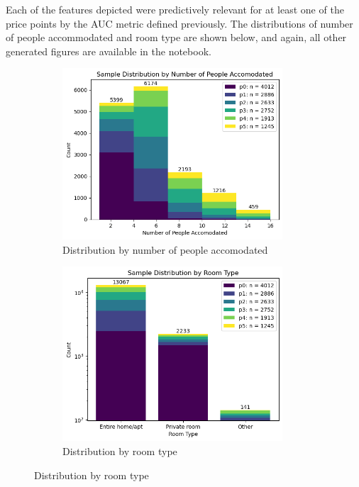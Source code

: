 \documentclass[12pt]{article}
\newtheorem{Proof of Lemma}{Proof of Lemma}
\begin{document}
Each of the features depicted were predictively relevant for at least one of the price points by the AUC metric defined previously. The distributions of number of people accommodated and room type are shown below, and again, all other generated figures are available in the notebook.

\begin{figure}[H]
	\begin{subfigure}{.5\textwidth}
		\includegraphics*[width=0.9\textwidth]{../figures/property_features/accommodates_distribution.png}
		\caption*{Distribution by number of people accomodated}
	\end{subfigure}%
	\begin{subfigure}{.5\textwidth}
		\includegraphics*[width=0.9\textwidth]{../figures/property_features/room_distribution.png}
		\caption*{Distribution by room type}
	\end{subfigure}%
\end{figure}
\end{document}
